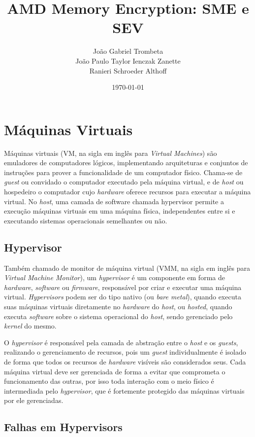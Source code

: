 \documentclass{report}
\title{AMD Memory Encryption: SME e SEV}
\author{João Gabriel Trombeta\\
        João Paulo Taylor Ienczak Zanette\\
        Ranieri Schroeder Althoff}
\date{\today}
\begin{document}
\maketitle

\tableofcontents

\chapter{Máquinas Virtuais}

Máquinas virtuais (VM, na sigla em inglês para \textit{Virtual Machines}) são
emuladores de computadores lógicos, implementando arquiteturas e conjuntos de
instruções para prover a funcionalidade de um computador físico. Chama-se de
\textit{guest} ou convidado o computador executado pela máquina virtual, e de
\textit{host} ou hospedeiro o computador cujo \textit{hardware} oferece
recursos para executar a máquina virtual. No \textit{host}, uma camada de
software chamada hypervisor permite a execução máquinas virtuais em uma máquina
física, independentes entre si e executando sistemas operacionais semelhantes
ou não.

\section{Hypervisor}

Também chamado de monitor de máquina virtual (VMM, na sigla em inglês para
\textit{Virtual Machine Monitor}), um \textit{hypervisor} é um componente em
forma de \textit{hardware}, \textit{software} ou \textit{firmware}, responsável
por criar e executar uma máquina virtual. \textit{Hypervisors} podem ser do
tipo nativo (ou \textit{bare metal}), quando executa suas máquinas virtuais
diretamente no \textit{hardware} do \textit{host}, ou \textit{hosted}, quando
executa \textit{software} sobre o sistema operacional do \textit{host}, sendo
gerenciado pelo \textit{kernel} do mesmo.

O \textit{hypervisor} é responsável pela camada de abstração entre o
\textit{host} e os \textit{guests}, realizando o gerenciamento de recursos,
pois um \textit{guest} individualmente é isolado de forma que todos os recursos
de \textit{hardware} visíveis são considerados seus. Cada máquina virtual deve
ser gerenciada de forma a evitar que comprometa o funcionamento das outras, por
isso toda interação com o meio físico é intermediada pelo \textit{hypervisor},
que é fortemente protegido das máquinas virtuais por ele gerenciadas.

\section{Falhas em Hypervisors}
\end{document}
